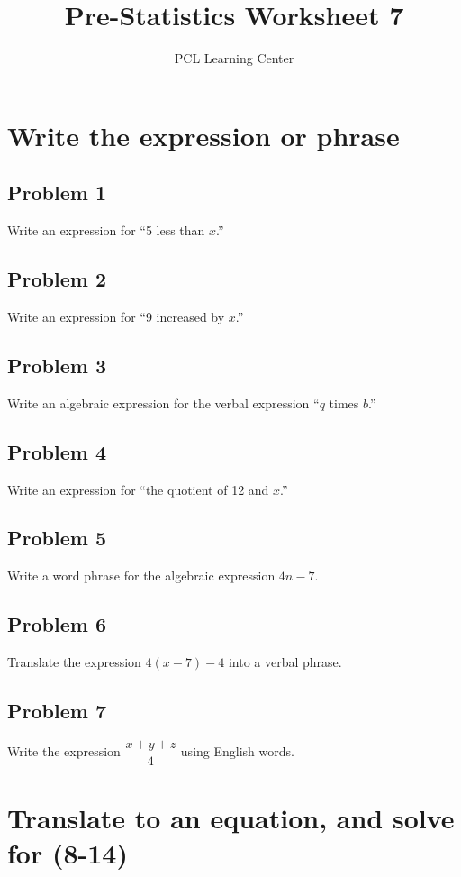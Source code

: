 \documentclass[12pt]{article}
\title{Pre-Statistics Worksheet 7}
\author{PCL Learning Center}
\date{}
\begin{document}
\maketitle

\section*{Write the expression or phrase}

\subsection*{Problem 1}
Write an expression for “5 less than \(x\).”

\subsection*{Problem 2}
Write an expression for “9 increased by \(x\).”

\subsection*{Problem 3}
Write an algebraic expression for the verbal expression “\(q\) times \(b\).”

\subsection*{Problem 4}
Write an expression for “the quotient of 12 and \(x\).”

\subsection*{Problem 5}
Write a word phrase for the algebraic expression \(4n - 7\).

\subsection*{Problem 6}
Translate the expression \(4(x - 7) - 4\) into a verbal phrase.

\subsection*{Problem 7}
Write the expression \(\dfrac{x + y + z}{4}\) using English words.

\section*{Translate to an equation, and solve for (8-14)}
\end{document}
